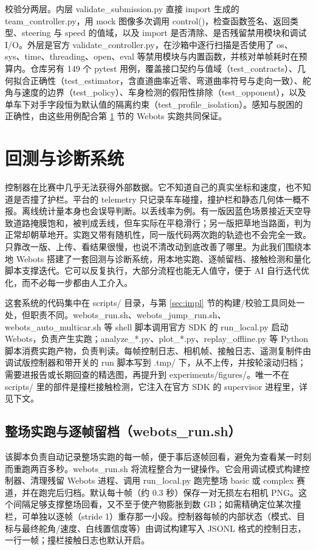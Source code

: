 \documentclass[UTF8,a4paper]{ctexart}
\begin{document}
校验分两层。内层 validate\_submission.py 直接 import 生成的 team\_controller.py，用 mock 图像多次调用 control()，检查函数签名、返回类型、steering 与 speed 的值域，以及 import 是否清除、是否残留禁用模块和调试 I/O。外层是官方 validate\_controller.py，在沙箱中逐行扫描是否使用了 os、sys、time、threading、open、eval 等禁用模块与内置函数，并核对单帧耗时在预算内。仓库另有 149 个 pytest 用例，覆盖接口契约与值域（test\_contracts）、几何拟合正确性（test\_estimator，含直道曲率近零、弯道曲率符号与走向一致）、舵角与速度的边界（test\_policy）、车身检测的假阳性排除（test\_opponent），以及单车下对手字段恒为默认值的隔离约束（test\_profile\_isolation）。感知与脱困的正确性，由这些用例配合第 \ref{sec:backtest} 节的 Webots 实跑共同保证。

\section{回测与诊断系统}\label{sec:backtest}

控制器在比赛中几乎无法获得外部数据。它不知道自己的真实坐标和速度，也不知道是否撞了护栏。平台的 telemetry 只记录车车碰撞，撞护栏和静态几何体一概不报。离线统计量本身也会误导判断。以丢线率为例。有一版因蓝色场景接近天空导致道路掩膜饱和，被判成丢线，但车实际在平稳滑行；另一版把草地当路面，判为正常却朝草地开。实跑又带有随机性，同一版代码两次跑的轨迹也不会完全一致。只靠改一版、上传、看结果很慢，也说不清改动到底改善了哪里。为此我们围绕本地 Webots 搭建了一套回测与诊断系统，用本地实跑、逐帧留档、接触检测和量化脚本支撑迭代。它可以反复执行，大部分流程也能无人值守，便于 AI 自行迭代优化，而不必每一步都由人工介入。

这套系统的代码集中在 scripts/ 目录，与第 \ref{sec:impl} 节的构建/校验工具同处一处，但职责不同。webots\_run.sh、webots\_jump\_run.sh、webots\_auto\_multicar.sh 等 shell 脚本调用官方 SDK 的 run\_local.py 启动 Webots，负责产生实跑；analyze\_*.py、plot\_*.py、replay\_offline.py 等 Python 脚本消费实跑产物，负责判读。每帧控制日志、相机帧、接触日志、遥测复制件由调试版控制器和带开关的 run 脚本写到 .tmp/ 下，从不上传，并按轮滚动归档；需要进报告或长期回查的精选图，再提升到 experiments/figures/。唯一不在 scripts/ 里的部件是撞栏接触检测，它注入在官方 SDK 的 supervisor 进程里，详见下文。

\subsection{整场实跑与逐帧留档（webots\_run.sh）}

该脚本负责自动记录整场实跑的每一帧，便于事后逐帧回看，避免为查看某一时刻而重跑两百多秒。webots\_run.sh 将流程整合为一键操作。它会用调试模式构建控制器、清理残留 Webots 进程、调用 run\_local.py 跑完整场 basic 或 complex 赛道，并在跑完后归档。默认每十帧（约 0.3 秒）保存一对无损左右相机 PNG。这个间隔足够支撑整场回看，又不至于使产物膨胀到数 GB；如需精确定位某次撞栏，可单独以逐帧（stride 1）重存那一小段。控制器每帧的内部状态（模式、目标与最终舵角/速度、白线置信度等）由调试构建写入 JSONL 格式的控制日志，一行一帧；撞栏接触日志也默认开启。
\end{document}
